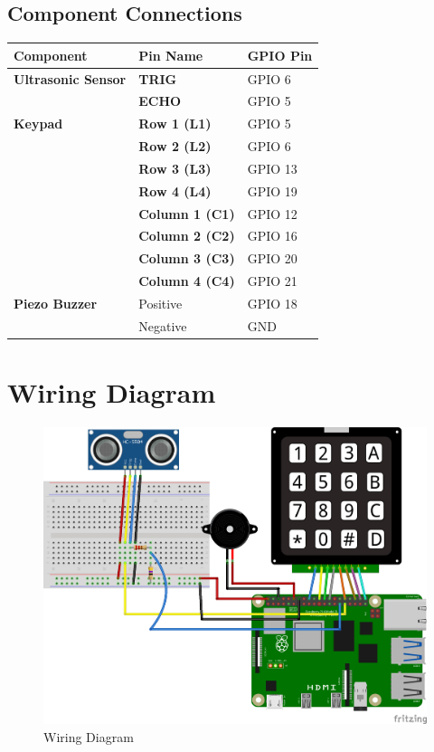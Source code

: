 \documentclass{article}
\begin{document}
	\subsection*{Component Connections}
	\begin{center}
		\begin{tabular}{|l|l|l|}
			\hline
			\textbf{Component}             & \textbf{Pin Name}   & \textbf{GPIO Pin}      \\
			\hline
			\textbf{Ultrasonic Sensor}     & \textbf{TRIG}       & GPIO 6                 \\
			& \textbf{ECHO}       & GPIO 5                 \\
			\textbf{Keypad}                & \textbf{Row 1 (L1)} & GPIO 5                 \\
			& \textbf{Row 2 (L2)} & GPIO 6                 \\
			& \textbf{Row 3 (L3)} & GPIO 13                \\
			& \textbf{Row 4 (L4)} & GPIO 19                \\
			& \textbf{Column 1 (C1)} & GPIO 12              \\
			& \textbf{Column 2 (C2)} & GPIO 16              \\
			& \textbf{Column 3 (C3)} & GPIO 20              \\
			& \textbf{Column 4 (C4)} & GPIO 21              \\
			\textbf{Piezo Buzzer}          & Positive            & GPIO 18                \\
			& Negative            & GND                    \\
			\hline
		\end{tabular}
	\end{center}
	
	\newpage
	\section*{Wiring Diagram}
	\begin{figure}[H]
		\centering
		\includegraphics[width=1.2\textwidth]{09c-keypad-piezo-buzzer-us.png} %
		\caption{Wiring Diagram}
	\end{figure}
	
\end{document}
